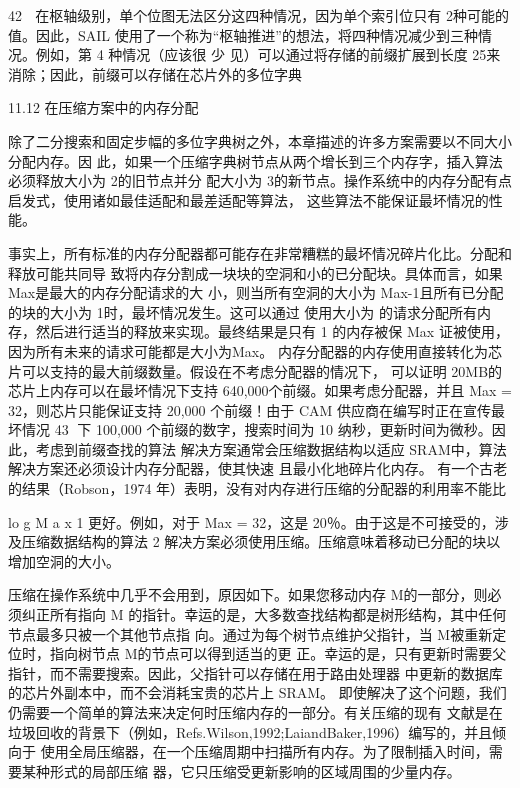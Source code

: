                                                       42
  在枢轴级别，单个位图无法区分这四种情况，因为单个索引位只有 2种可能的值。因此，SAIL
 使用了一个称为“枢轴推进”的想法，将四种情况减少到三种情况。例如，第 4 种情况（应该很
                                            少
见）可以通过将存储的前缀扩展到长度 25来消除；因此，前缀可以存储在芯片外的多位字典




11.12 在压缩方案中的内存分配

除了二分搜索和固定步幅的多位字典树之外，本章描述的许多方案需要以不同大小分配内存。因
此，如果一个压缩字典树节点从两个增长到三个内存字，插入算法必须释放大小为 2的旧节点并分
配大小为 3的新节点。操作系统中的内存分配有点启发式，使用诸如最佳适配和最差适配等算法，
这些算法不能保证最坏情况的性能。



事实上，所有标准的内存分配器都可能存在非常糟糕的最坏情况碎片化比。分配和释放可能共同导
致将内存分割成一块块的空洞和小的已分配块。具体而言，如果 Max是最大的内存分配请求的大
小，则当所有空洞的大小为 Max-1且所有已分配的块的大小为 1时，最坏情况发生。这可以通过
使用大小为 的请求分配所有内存，然后进行适当的释放来实现。最终结果是只有 1 的内存被保
                                                  Max
证被使用，因为所有未来的请求可能都是大小为Max。
内存分配器的内存使用直接转化为芯片可以支持的最大前缀数量。假设在不考虑分配器的情况下，
可以证明 20MB的芯片上内存可以在最坏情况下支持 640,000个前缀。如果考虑分配器，并且
Max = 32，则芯片只能保证支持 20,000 个前缀！由于 CAM 供应商在编写时正在宣传最坏情况
                                                   43
下 100,000 个前缀的数字，搜索时间为 10 纳秒，更新时间为微秒。因此，考虑到前缀查找的算法
解决方案通常会压缩数据结构以适应 SRAM中，算法解决方案还必须设计内存分配器，使其快速
且最小化地碎片化内存。
有一个古老的结果（Robson，1974 年）表明，没有对内存进行压缩的分配器的利用率不能比

lo
g
M
a
x
 1 更好。例如，对于 Max = 32，这是 20％。由于这是不可接受的，涉及压缩数据结构的算法
2
解决方案必须使用压缩。压缩意味着移动已分配的块以增加空洞的大小。

压缩在操作系统中几乎不会用到，原因如下。如果您移动内存 M的一部分，则必须纠正所有指向
M 的指针。幸运的是，大多数查找结构都是树形结构，其中任何节点最多只被一个其他节点指
向。通过为每个树节点维护父指针，当 M被重新定位时，指向树节点 M的节点可以得到适当的更
正。幸运的是，只有更新时需要父指针，而不需要搜索。因此，父指针可以存储在用于路由处理器
中更新的数据库的芯片外副本中，而不会消耗宝贵的芯片上 SRAM。
即使解决了这个问题，我们仍需要一个简单的算法来决定何时压缩内存的一部分。有关压缩的现有
文献是在垃圾回收的背景下（例如，Refs.Wilson,1992;LaiandBaker,1996）编写的，并且倾向于
使用全局压缩器，在一个压缩周期中扫描所有内存。为了限制插入时间，需要某种形式的局部压缩
器，它只压缩受更新影响的区域周围的少量内存。



